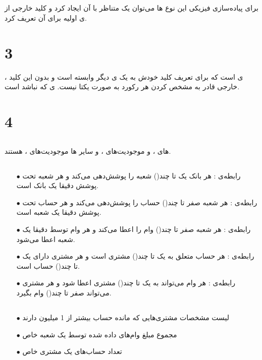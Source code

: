 \documentclass{article}
\begin{document}
\subsection{}
برای پیاده‌سازی فیزیکی این نوع ها می‌توان یک  متناظر با آن  ایجاد کرد و کلید خارجی از ی اولیه برای آن تعریف کرد.
\section{3}
، ی است که برای تعریف کلید خودش به یک ی دیگر وابسته است و بدون این کلید خارجی قادر به مشخص کردن هر رکورد به صورت یکتا نیست. ی که  نباشد  است.
\section{4}
\subsection{}
های ،  و  موجودیت‌های ، و سایر ها موجودیت‌های ، هستند.
\subsection{}
\begin{itemize}
    \item [$\bullet$] رابطه‌ی :
هر بانک یک تا چند() شعبه را پوشش‌دهی می‌کند و هر شعبه تحت پوشش دقیقا یک بانک است.
    \item [$\bullet$] رابطه‌ی :
هر شعبه صفر تا چند() حساب را پوشش‌دهی می‌کند و هر حساب تحت پوشش دقیقا یک شعبه است.
    \item [$\bullet$] رابطه‌ی :
هر شعبه صفر تا چند() وام را اعطا می‌کند و هر وام توسط دقیقا یک شعبه اعطا می‌شود.
    \item [$\bullet$] رابطه‌ی :
هر حساب متعلق به یک تا چند() مشتری است و هر مشتری دارای یک تا چند() حساب است.
    \item [$\bullet$] رابطه‌ی :
هر وام می‌تواند به یک تا چند() مشتری اعطا شود و هر مشتری می‌تواند صفر تا چند() وام بگیرد.

\end{itemize}
\subsection{}
\begin{itemize}
    \item [$\bullet$] لیست مشخصات مشتری‌هایی که مانده حساب بیشتر از 1 میلیون دارند
    \item [$\bullet$] مجموع مبلغ وام‌های داده شده توسط یک شعبه خاص
    \item [$\bullet$] تعداد حساب‌های یک مشتری خاص
\end{itemize}
\end{document}
